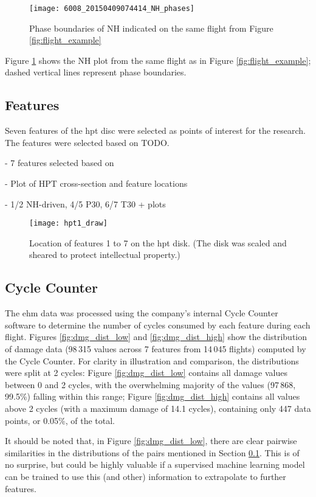 \begin{figure}
    \centering
    \texttt{[image: 6008\_20150409074414\_NH\_phases]}
    \caption{\label{fig:phases_example} Phase boundaries of NH indicated on the same flight from Figure \ref{fig:flight_example}}
\end{figure}

Figure \ref{fig:phases_example} shows the NH plot from the same flight as in Figure \ref{fig:flight_example}; dashed vertical lines represent phase boundaries.

\subsection{Features} \label{sec:features}
Seven features of the \ac{hpt} disc were selected as points of interest for the research. The features were selected based on TODO.

- 7 features selected based on

- Plot of HPT cross-section and feature locations

- 1/2 NH-driven, 4/5 P30, 6/7 T30 + plots

\begin{figure}
    \centering
    \texttt{[image: hpt1\_draw]}
    \caption{\label{fig:hpt1} Location of features 1 to 7 on the \ac{hpt} disk. (The disk was scaled and sheared to protect intellectual property.)}
\end{figure}

\subsection{Cycle Counter} \label{sec:cyclecounter}
The \ac{ehm} data was processed using the company's internal Cycle Counter software to determine the number of cycles consumed by each feature during each flight. Figures \ref{fig:dmg_dist_low} and \ref{fig:dmg_dist_high} show the distribution of damage data (98\,315 values across 7 features from 14\,045 flights) computed by the Cycle Counter. For clarity in illustration and comparison, the distributions were split at 2 cycles: Figure \ref{fig:dmg_dist_low} contains all damage values between 0 and 2 cycles, with the overwhelming majority of the values (97\,868, 99.5\%) falling within this range; Figure \ref{fig:dmg_dist_high} contains all values above 2 cycles (with a maximum damage of 14.1 cycles), containing only 447 data points, or 0.05\%, of the total.

It should be noted that, in Figure \ref{fig:dmg_dist_low}, there are clear pairwise similarities in the distributions of the pairs mentioned in Section \ref{sec:features}. This is of no surprise, but could be highly valuable if a supervised machine learning model can be trained to use this (and other) information to extrapolate to further features.

